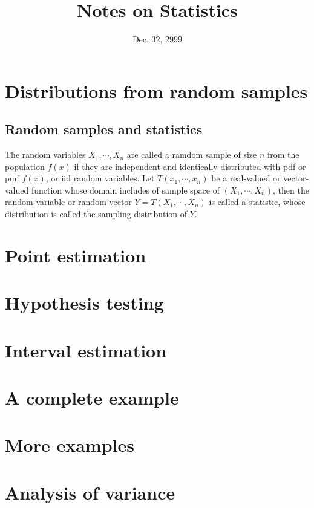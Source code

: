\documentclass[12pt]{article}
\begin{document}
\title{Notes on Statistics}
\date{Dec. 32, 2999}

\maketitle

\section{Distributions from random samples}

  \subsection{Random samples and statistics}

    The random variables $X_1,\cdots,X_n$ are called a ramdom sample of 
    size $n$ from the population $f(x)$ if they are independent and identically
    distributed with pdf or pmf $f(x)$, or iid random
    variables. Let $T(x_1,\cdots,x_n)$ be a real-valued or vector-valued
    function whose domain includes of sample space of $(X_1,\cdots,X_n)$,
    then the random variable or random vector $Y=T(X_1,\cdots,X_n)$ is called 
    a statistic, whose distribution is called the sampling distribution of $Y$.


\section{Point estimation}

\section{Hypothesis testing}

\section{Interval estimation}

\section{A complete example}

\section{More examples}

\section{Analysis of variance}
\end{document}
